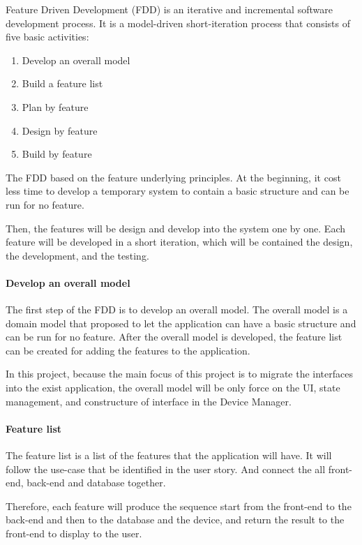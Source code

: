 Feature Driven Development (FDD) is an iterative and incremental software development process.
It is a model-driven short-iteration process that consists of five basic activities:

\begin{enumerate}
    \item Develop an overall model
    \item Build a feature list
    \item Plan by feature
    \item Design by feature
    \item Build by feature
\end{enumerate}

The FDD based on the feature underlying principles. At the beginning, 
it cost less time to develop a temporary system to contain a basic structure 
and can be run for no feature.

Then, the features will be design and develop into the system one by one.
Each feature will be developed in a short iteration, which will be contained
the design, the development, and the testing.

\paragraph{Develop an overall model}
The first step of the FDD is to develop an overall model. 
The overall model is a domain model that proposed to let the application
can have a basic structure and can be run for no feature.
After the overall model is developed, 
the feature list can be created for adding the features to the application.

In this project, because the main focus of this project is to migrate
the interfaces into the exist application, the overall model will be only 
force on the UI, state management, and constructure of interface
in the Device Manager.

\paragraph{Feature list}
The feature list is a list of the features that the application will have.
It will follow the use-case that be identified in the user story. 
And connect the all front-end, back-end and database together.

Therefore, each feature will produce the sequence start 
from the front-end to the back-end and then to the database and the device,
and return the result to the front-end to display to the user.